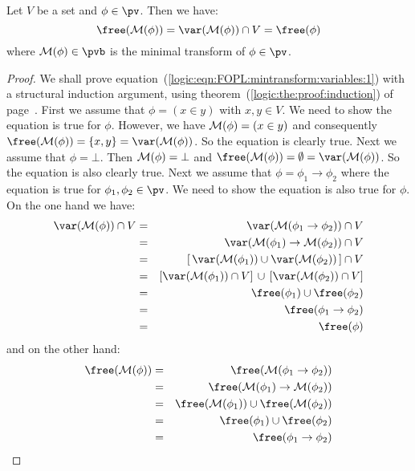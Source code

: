 \begin{prop}\label{logic:prop:FOPL:mintransform:variables}
Let $V$ be a set and $\phi\in\pv$. Then we have:
    \begin{equation}\label{logic:eqn:FOPL:mintransform:variables:1}
    \free({\cal M}(\phi))=\var({\cal M}(\phi))\cap V=\free(\phi)
    \end{equation}
where ${\cal M}(\phi)\in\pvb$ is the minimal transform of
$\phi\in\pv$.
\end{prop}
\begin{proof}
We shall prove
equation~(\ref{logic:eqn:FOPL:mintransform:variables:1}) with a
structural induction argument, using
theorem~(\ref{logic:the:proof:induction}) of
page~\pageref{logic:the:proof:induction}. First we assume that
$\phi=(x\in y)$ with $x,y\in V$. We need to show the equation is
true for $\phi$. However, we have ${\cal M}(\phi)=(x\in y)$ and
consequently $\free({\cal M}(\phi))=\{x,y\}=\var({\cal M}(\phi))$.
So the equation is clearly true. Next we assume that $\phi=\bot$.
Then ${\cal M}(\phi)=\bot$ and $\free({\cal
M}(\phi))=\emptyset=\var({\cal M}(\phi))$. So the equation is also
clearly true. Next we assume that $\phi=\phi_{1}\to\phi_{2}$ where
the equation is true for $\phi_{1},\phi_{2}\in\pv$. We need to show
the equation is also true for $\phi$. On the one hand we have:
    \begin{eqnarray*}
    \var({\cal M}(\phi))\cap V&=&\var({\cal
    M}(\phi_{1}\to\phi_{2}))\cap V\\
    &=&\var({\cal M}(\phi_{1})\to{\cal M}(\phi_{2}))\cap V\\
    &=&[\,\var({\cal M}(\phi_{1}))\cup\var({\cal M}(\phi_{2}))\,]\cap
    V\\
    &=&[\var({\cal M}(\phi_{1}))\cap V]\,\cup\,[\var({\cal
    M}(\phi_{2}))\cap V]\\
    &=&\free(\phi_{1})\cup\free(\phi_{2})\\
    &=&\free(\phi_{1}\to\phi_{2})\\
    &=&\free(\phi)
    \end{eqnarray*}
and on the other hand:
    \begin{eqnarray*}
    \free({\cal M}(\phi))&=&\free({\cal M}(\phi_{1}\to\phi_{2}))\\
    &=&\free({\cal M}(\phi_{1})\to{\cal M}(\phi_{2}))\\
    &=&\free({\cal M}(\phi_{1}))\cup\free({\cal M}(\phi_{2}))\\
    &=&\free(\phi_{1})\cup\free(\phi_{2})\\
    &=&\free(\phi_{1}\to\phi_{2})\\

\end{eqnarray*}
\end{proof}

